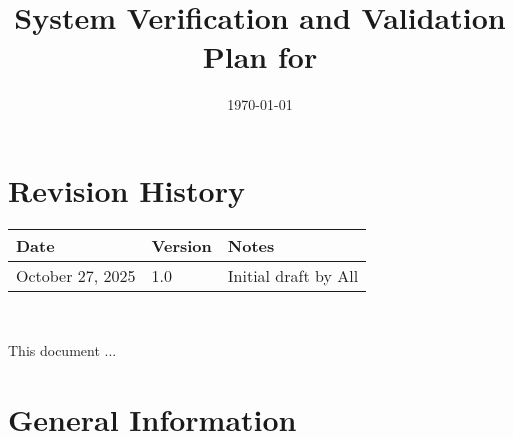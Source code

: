 \documentclass[12pt, titlepage]{article}
\begin{document}
\title{System Verification and Validation Plan for \progname{}} 
\author{\authname}
\date{\today}
	
\maketitle


\section*{Revision History}

\begin{tabularx}{\textwidth}{p{3cm}p{2cm}X}
\toprule {\bf Date} & {\bf Version} & {\bf Notes}\\
\midrule
October 27, 2025 & 1.0 & Initial draft by All\\
\bottomrule
\end{tabularx}

~\\
\iffalse
\wss{The intention of the VnV plan is to increase confidence in the software.
However, this does not mean listing every verification and validation technique
that has ever been devised.  The VnV plan should also be a \textbf{feasible}
plan. Execution of the plan should be possible with the time and team available.
If the full plan cannot be completed during the time available, it can either be
modified to ``fake it'', or a better solution is to add a section describing
what work has been completed and what work is still planned for the future.}

\wss{The VnV plan is typically started after the requirements stage, but before
the design stage.  This means that the sections related to unit testing cannot
initially be completed.  The sections will be filled in after the design stage
is complete.  the final version of the VnV plan should have all sections filled
in.}
\fi

\newpage

\tableofcontents

\newpage

\listoftables

\newpage


This document ... 

\section{General Information}
\end{document}
